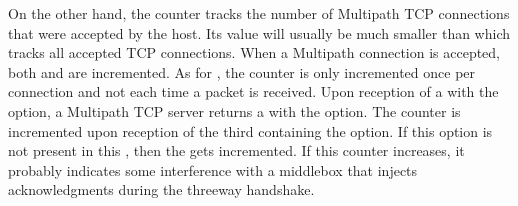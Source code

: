 \documentclass[letterpaper,10pt,english]{sphinxmanual}
\begin{document}
\sphinxAtStartPar
On the other hand, the  counter tracks the
number of Multipath TCP connections that were accepted by the host.
Its value will usually be much smaller than  which
tracks all accepted TCP connections. When a Multipath connection is accepted,
both  and  are incremented.
As for , the  counter is
only incremented once per connection and not each time a packet is received.
Upon reception of a  with the  option, a
Multipath TCP server returns a  with the 
option. The  counter is incremented upon reception
of the third  containing the  option. If this option
is not present in this , then the 
gets incremented.
If this counter increases, it probably indicates some interference with a
middlebox that injects acknowledgments during the three\sphinxhyphen{}way handshake.
\def\sphinxLiteralBlockLabel{\label{\detokenize{nstat-mptcp:id6}}}
\begin{sphinxVerbatim}[commandchars=\\\{\}]
\end{sphinxVerbatim}
\def\sphinxLiteralBlockLabel{\label{\detokenize{nstat-mptcp:id7}}}
\end{document}
